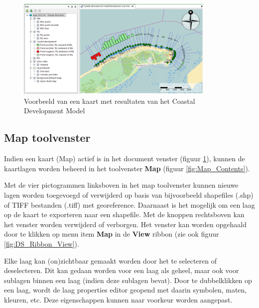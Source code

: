 \begin{figure}[H]
	\centering
		\includegraphics[width=0.85\textwidth]{figures/chapter_general/Map_With_MapContents.png}
		\caption{Voorbeeld van een kaart met resultaten van het Coastal Development Model}
	\label{fig:DS_Map}
\end{figure}

\subsection{Map toolvenster}
	\label{sec:DS_Map_Contents}
Indien een kaart (Map) actief is in het document venster (figuur \ref{fig:DS_Map}), kunnen de kaartlagen worden beheerd in het toolvenster \textbf{Map} (figuur \ref{fig:Map_Contents}).

Met de vier pictogrammen linksboven in het map toolvenster kunnen nieuwe lagen worden toegevoegd of verwijderd op basis van bijvoorbeeld shapefiles (.shp) of TIFF bestanden (.tiff) met georeference. Daarnaast is het mogelijk om een laag op de kaart te exporteren naar een shapefile. Met de knoppen rechtsboven kan het venster worden verwijderd of verborgen. Het venster kan worden opgehaald door te klikken op menu item \textbf{Map} in de \textbf{View} ribbon (zie ook figuur \ref{fig:DS_Ribbon_View}).

Elke laag kan (on)zichtbaar gemaakt worden door het te selecteren of deselecteren. Dit kan gedaan worden voor een laag als geheel, maar ook voor sublagen binnen een laag (indien deze sublagen bevat). Door te dubbelklikken op een laag, wordt de laag properties editor geopend met daarin symbolen, maten, kleuren, etc. Deze eigenschappen kunnen naar voorkeur worden aangepast.

